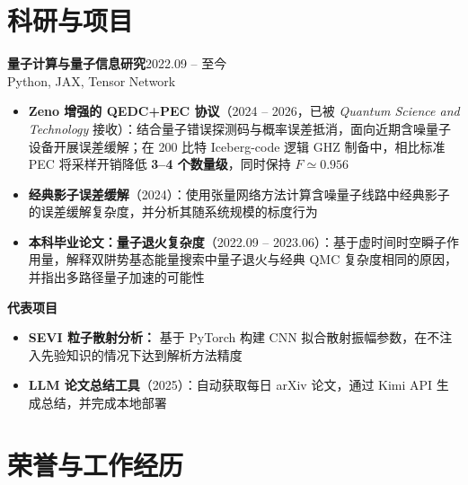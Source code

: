 \documentclass[10pt, a4paper]{article}
\newcommand{\entry}[2]{%
    \vspace{0.1em}
    \noindent\textbf{#1}\hfill{\small\color{graytext}#2}\\[-0.4em]
}
\newcommand{\entrysub}[2]{%
    \noindent{\small #1}\hfill{\small\color{graytext}#2}\\[-0.5em]
}
\begin{document}
\section{科研与项目}

\entry{量子计算与量子信息研究}{2022.09 -- 至今}
\entrysub{清华大学物理系}{Python, JAX, Tensor Network}
\begin{itemize}
    \item \textbf{Zeno 增强的 QEDC+PEC 协议}（2024 -- 2026，已被 \textit{Quantum Science and Technology} 接收）：结合量子错误探测码与概率误差抵消，面向近期含噪量子设备开展误差缓解；在 200 比特 Iceberg-code 逻辑 GHZ 制备中，相比标准 PEC 将采样开销降低 \textbf{3--4 个数量级}，同时保持 $F\simeq0.956$
    \item \textbf{经典影子误差缓解}（2024）：使用张量网络方法计算含噪量子线路中经典影子的误差缓解复杂度，并分析其随系统规模的标度行为
    \item \textbf{本科毕业论文：量子退火复杂度}（2022.09 -- 2023.06）：基于虚时间时空瞬子作用量，解释双阱势基态能量搜索中量子退火与经典 QMC 复杂度相同的原因，并指出多路径量子加速的可能性
\end{itemize}

\entry{代表项目}{}
\begin{itemize}
    \item \textbf{SEVI 粒子散射分析：} 基于 PyTorch 构建 CNN 拟合散射振幅参数，在不注入先验知识的情况下达到解析方法精度
    \item \textbf{LLM 论文总结工具}（2025）：自动获取每日 arXiv 论文，通过 Kimi API 生成总结，并完成本地部署
\end{itemize}

\section{荣誉与工作经历}
\\[-0.2em]
\end{document}
